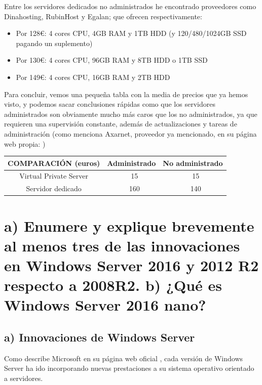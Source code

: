 Entre los servidores dedicados no administrados he encontrado proveedores como Dinahosting, RubinHost y Egalan; que ofrecen respectivamente:
\begin{itemize}
	\item Por 128\euro{}: 4 cores CPU, 4GB RAM y 1TB HDD (y 120/480/1024GB SSD pagando un suplemento) \cite{dinahosting2}
	\item Por 130\euro{}: 4 cores CPU, 96GB RAM y 8TB HDD o 1TB SSD \cite{rubinhost}
	\item Por 149\euro{}: 4 cores CPU, 16GB RAM y 2TB HDD \cite{egalan}
\end{itemize}

Para concluir, vemos una pequeña tabla con la media de precios que ya hemos visto, y podemos sacar conclusiones rápidas como que
los servidores administrados son obviamente mucho más caros que los no administrados, ya que requieren una supervisión constante,
además de actualizaciones y tareas de administración (como menciona Axarnet, proveedor ya mencionado, en su página web propia:
\cite{axarnet-descripcion})

\begin{center}
	\begin{tabular}{| c | c | c|}
	\hline
	 COMPARACIÓN (euros) & Administrado & No administrado \\ \hline
	 Virtual Private Server & ~ 15 & ~ 15 \\ \hline
	 Servidor dedicado & ~ 160 & ~ 140 \\ \hline
	\end{tabular}
\end{center}


\section{a) Enumere y explique brevemente al menos tres de las innovaciones en Windows Server 2016 y 2012 R2 respecto a 2008R2.
b) ¿Qué es Windows Server 2016 nano?}

\subsection{a) Innovaciones de Windows Server}
Como describe Microsoft en su página web oficial \cite{microsoft-ws}, cada versión de Windows Server ha ido incorporando nuevas
prestaciones a su sistema operativo orientado a servidores.

